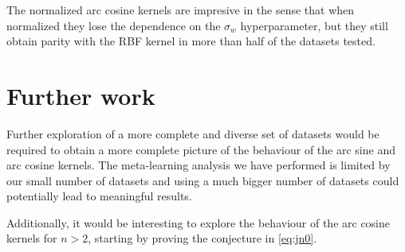 The normalized arc cosine kernels are impresive in the sense that when normalized
they lose the dependence on the $\sigma_w$ hyperparameter, but they still obtain
parity with the RBF kernel in more than half of the datasets tested.

\section{Further work}

Further exploration of a more complete and diverse set of datasets would be
required to obtain a more complete picture of the behaviour of the arc sine
and arc cosine kernels. The meta-learning analysis we have performed is
limited by our small number of datasets and using a much bigger number of
datasets could potentially lead to meaningful results.

Additionally, it would be interesting to explore
the behaviour of the arc cosine kernels for $n>2$, starting by proving
the conjecture in \cref{eq:jn0}.




